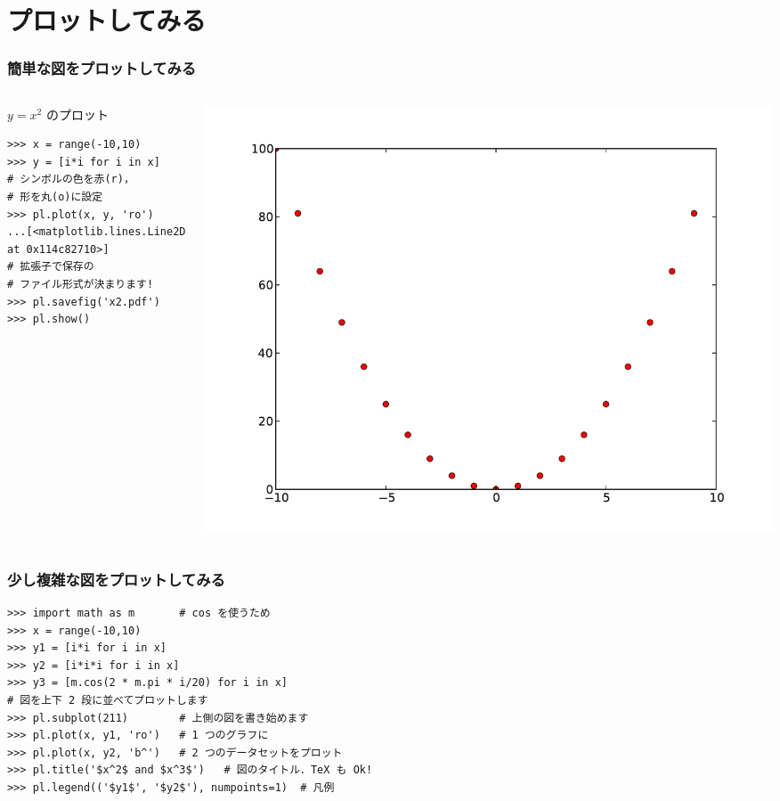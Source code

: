 \section{プロットしてみる}
\begin{frame}[t,fragile]
\frametitle{簡単な図をプロットしてみる}
\begin{columns}
\begin{column}{6cm}
$y = x^2$ のプロット
\begin{lstlisting}
>>> x = range(-10,10)
>>> y = [i*i for i in x]
# シンボルの色を赤(r)，
# 形を丸(o)に設定
>>> pl.plot(x, y, 'ro')
...[<matplotlib.lines.Line2D at 0x114c82710>]
# 拡張子で保存の
# ファイル形式が決まります!
>>> pl.savefig('x2.pdf') 
>>> pl.show()
\end{lstlisting}
\end{column}

\begin{column}{6cm}
\includegraphics[width=\textwidth]{x2.pdf}
\end{column}
\end{columns}
\end{frame}

\begin{frame}[t,fragile]
\frametitle{少し複雑な図をプロットしてみる}
\begin{lstlisting}
>>> import math as m       # cos を使うため
>>> x = range(-10,10)
>>> y1 = [i*i for i in x]
>>> y2 = [i*i*i for i in x]
>>> y3 = [m.cos(2 * m.pi * i/20) for i in x]
# 図を上下 2 段に並べてプロットします
>>> pl.subplot(211)        # 上側の図を書き始めます
>>> pl.plot(x, y1, 'ro')   # 1 つのグラフに
>>> pl.plot(x, y2, 'b^')   # 2 つのデータセットをプロット
>>> pl.title('$x^2$ and $x^3$')   # 図のタイトル．TeX も Ok!
>>> pl.legend(('$y1$', '$y2$'), numpoints=1)  # 凡例
\end{lstlisting}
\end{frame}

